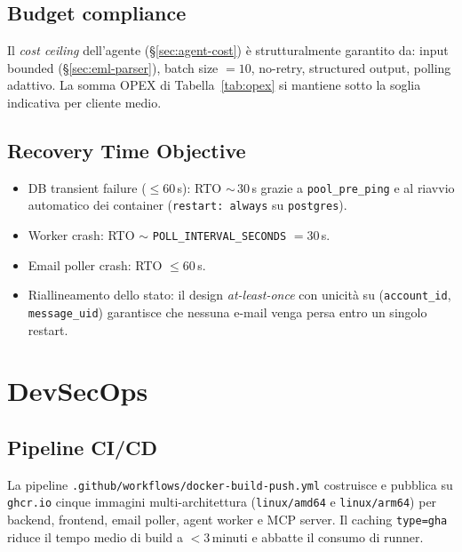 \documentclass[11pt,a4paper,oneside]{article}
\begin{document}
\subsection{Budget compliance}
Il \emph{cost ceiling} dell'agente (\S\ref{sec:agent-cost}) \`e
strutturalmente garantito da: input bounded (\S\ref{sec:eml-parser}),
batch size $=10$, no-retry, structured output, polling adattivo.
La somma OPEX di Tabella~\ref{tab:opex} si mantiene sotto la soglia
indicativa per cliente medio.

\subsection{Recovery Time Objective}
\begin{itemize}[leftmargin=*]
    \item DB transient failure ($\leq 60$\,s): RTO $\sim$\,30\,s grazie a
          \texttt{pool\_pre\_ping} e al riavvio automatico dei container
          (\texttt{restart: always} su \texttt{postgres}).
    \item Worker crash: RTO $\sim$ \texttt{POLL\_INTERVAL\_SECONDS} $= 30$\,s.
    \item Email poller crash: RTO $\leq 60$\,s.
    \item Riallineamento dello stato: il design \emph{at-least-once} con
          unicit\`a su (\texttt{account\_id}, \texttt{message\_uid}) garantisce
          che nessuna e-mail venga persa entro un singolo restart.
\end{itemize}

\section{DevSecOps}

\subsection{Pipeline CI/CD}
La pipeline \texttt{.github/workflows/docker-build-push.yml} costruisce e
pubblica su \texttt{ghcr.io} cinque immagini multi-architettura
(\texttt{linux/amd64} e \texttt{linux/arm64}) per backend, frontend, email
poller, agent worker e MCP server. Il caching \texttt{type=gha} riduce il
tempo medio di build a $<3$\,minuti e abbatte il consumo di runner.
\end{document}
